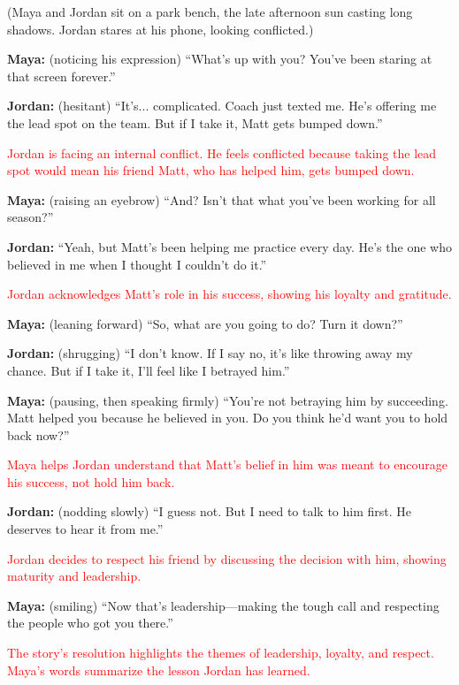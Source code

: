 \documentclass[12pt]{article}
\begin{document}
\begin{tcolorbox}[colframe=black!60, colback=white, 
coltitle=black, colbacktitle=black!15, fonttitle=\bfseries\Large, 
title=\textit{The Choice}, halign title=center, left=10pt, right=10pt, top=10pt, bottom=15pt]

(Maya and Jordan sit on a park bench, the late afternoon sun casting long shadows. Jordan stares at his phone, looking conflicted.)

\textbf{Maya:} (noticing his expression) “What’s up with you? You’ve been staring at that screen forever.”

\textbf{Jordan:} (hesitant) “It’s... complicated. Coach just texted me. He’s offering me the lead spot on the team. But if I take it, Matt gets bumped down.”

\textcolor{red}{Jordan is facing an internal conflict. He feels conflicted because taking the lead spot would mean his friend Matt, who has helped him, gets bumped down.}

\textbf{Maya:} (raising an eyebrow) “And? Isn’t that what you’ve been working for all season?”

\textbf{Jordan:} “Yeah, but Matt’s been helping me practice every day. He’s the one who believed in me when I thought I couldn’t do it.”

\textcolor{red}{Jordan acknowledges Matt’s role in his success, showing his loyalty and gratitude.}

\textbf{Maya:} (leaning forward) “So, what are you going to do? Turn it down?”

\textbf{Jordan:} (shrugging) “I don’t know. If I say no, it’s like throwing away my chance. But if I take it, I’ll feel like I betrayed him.”

\textbf{Maya:} (pausing, then speaking firmly) “You’re not betraying him by succeeding. Matt helped you because he believed in you. Do you think he’d want you to hold back now?”

\textcolor{red}{Maya helps Jordan understand that Matt's belief in him was meant to encourage his success, not hold him back.}

\textbf{Jordan:} (nodding slowly) “I guess not. But I need to talk to him first. He deserves to hear it from me.”

\textcolor{red}{Jordan decides to respect his friend by discussing the decision with him, showing maturity and leadership.}

\textbf{Maya:} (smiling) “Now that’s leadership—making the tough call and respecting the people who got you there.”

\textcolor{red}{The story’s resolution highlights the themes of leadership, loyalty, and respect. Maya’s words summarize the lesson Jordan has learned.}

\end{tcolorbox}
\end{document}
